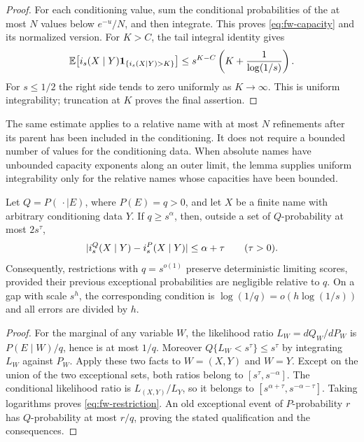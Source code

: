 \begin{proof}
For each conditioning value, sum the conditional probabilities of
the at most $N$ values below $e^{-u}/N$, and then integrate.  This
proves \eqref{eq:fw-capacity} and its normalized version.  For $K>C$,
the tail integral identity gives
\[
 \mathbb E\bigl[i_s(X\mid Y)\mathbf 1_{\{i_s(X\mid Y)>K\}}\bigr]
 \le s^{K-C}\left(K+\frac1{\log(1/s)}\right).
\]
For $s\le1/2$ the right side tends to zero uniformly as $K\to\infty$.
This is uniform integrability; truncation at $K$ proves the final
assertion.
\end{proof}

The same estimate applies to a relative name with at most $N$
refinements after its parent has been included in the conditioning.
It does not require a bounded number of values for the conditioning
data.  When absolute names have unbounded capacity exponents along
an outer limit, the lemma supplies uniform integrability only for
the relative names whose capacities have been bounded.

\begin{lemma}
\label{lem:fw-restriction}
Let $Q=P(\,\cdot\mid E)$, where $P(E)=q>0$, and let $X$ be a finite
name with arbitrary conditioning data $Y$.  If $q\ge s^\alpha$,
then, outside a set of $Q$-probability at most $2s^\tau$,
\begin{equation}\label{eq:fw-restriction}
 \lvert i_s^Q(X\mid Y)-i_s^P(X\mid Y)\rvert\le\alpha+\tau
 \qquad(\tau>0).
\end{equation}
Consequently, restrictions with $q=s^{o(1)}$ preserve deterministic
limiting scores, provided their previous exceptional probabilities
are negligible relative to $q$.  On a gap with scale $s^h$, the
corresponding condition is $\log(1/q)=o(h\log(1/s))$ and all errors
are divided by $h$.
\end{lemma}

\begin{proof}
For the marginal of any variable $W$, the likelihood ratio
$L_W=dQ_W/dP_W$ is $P(E\mid W)/q$, hence is at most $1/q$.
Moreover
$Q\{L_W<s^\tau\}\le s^\tau$ by integrating $L_W$ against $P_W$.
Apply these two facts to $W=(X,Y)$ and $W=Y$.  Except on the union
of the two exceptional sets, both ratios belong to
$[s^\tau,s^{-\alpha}]$.  The conditional likelihood ratio is
$L_{(X,Y)}/L_Y$, so it belongs to
$[s^{\alpha+\tau},s^{-\alpha-\tau}]$.
Taking logarithms proves \eqref{eq:fw-restriction}.
An old exceptional event of $P$-probability $r$ has $Q$-probability
at most $r/q$, proving the stated qualification and the consequences.
\end{proof}


